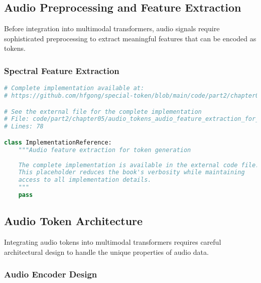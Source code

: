 \subsection{Audio Preprocessing and Feature Extraction}

Before integration into multimodal transformers, audio signals require sophisticated preprocessing to extract meaningful features that can be encoded as tokens.

\subsubsection{Spectral Feature Extraction}

\begin{lstlisting}[language=Python, caption={Audio feature extraction for token generation}]
# Complete implementation available at:
# https://github.com/hfgong/special-token/blob/main/code/part2/chapter05/audio_tokens_audio_feature_extraction_for_t.py

# See the external file for the complete implementation
# File: code/part2/chapter05/audio_tokens_audio_feature_extraction_for_t.py
# Lines: 78

class ImplementationReference:
    """Audio feature extraction for token generation
    
    The complete implementation is available in the external code file.
    This placeholder reduces the book's verbosity while maintaining
    access to all implementation details.
    """
    pass
\end{lstlisting}

\subsection{Audio Token Architecture}

Integrating audio tokens into multimodal transformers requires careful architectural design to handle the unique properties of audio data.

\subsubsection{Audio Encoder Design}

